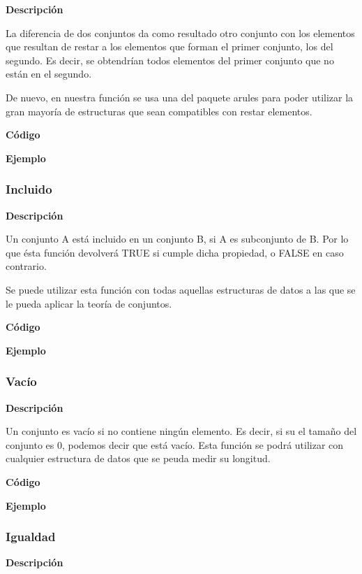     \textbf{Descripci\'on}

    La diferencia de dos conjuntos da como resultado otro conjunto con los elementos que resultan de 
    restar a los elementos que forman el primer conjunto, los del segundo. Es decir, se obtendr\'ian 
    todos elementos del  primer conjunto que no est\'an en el segundo.

    De nuevo, en nuestra funci\'on se usa una del paquete arules para poder utilizar la gran mayor\'ia de estructuras 
    que sean compatibles con restar elementos.
    

    \textbf{C\'odigo}

    
    \textbf{Ejemplo}


\subsubsection{Incluido}

    \textbf{Descripci\'on}

    Un conjunto A est\'a incluido en un conjunto B, si A es subconjunto de B. Por lo que \'esta funci\'on 
    devolver\'a TRUE si cumple dicha propiedad, o FALSE en caso contrario.

    Se puede utilizar esta funci\'on con todas aquellas estructuras de datos a las que se le pueda aplicar 
    la teor\'ia de conjuntos.

    \textbf{C\'odigo}


    \textbf{Ejemplo}


\subsubsection{Vac\'io}

    \textbf{Descripci\'on}

    Un conjunto es vac\'io si no contiene ning\'un elemento. Es decir, si su el tama\~no del conjunto es 0, 
    podemos decir que est\'a vac\'io. Esta funci\'on se podr\'a utilizar con cualquier estructura de datos 
    que se peuda medir su longitud.

    \textbf{C\'odigo}


    \textbf{Ejemplo}


\subsubsection{Igualdad}

    \textbf{Descripci\'on}

